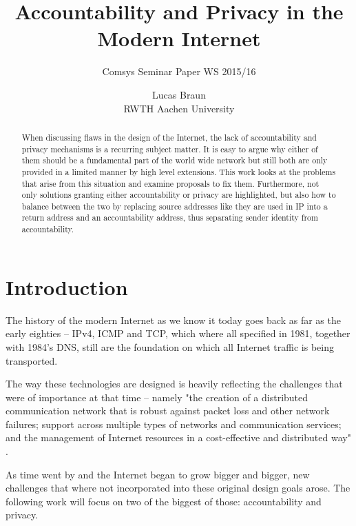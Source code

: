 \documentclass{acm_proc_article-sp}
\begin{document}
\title{Accountability and Privacy in the Modern Internet}
\subtitle{Comsys Seminar Paper WS 2015/16}

\author{
\alignauthor
Lucas Braun\\
	RWTH Aachen University \\
}

\maketitle
\begin{abstract}
When discussing flaws in the design of the Internet, the lack of accountability and privacy mechanisms is a recurring subject matter. It is easy to argue why either of them should be a fundamental part of the world wide network but still both are only provided in a limited manner by high level extensions. This work looks at the problems that arise from this situation and examine proposals to fix them. Furthermore, not only solutions granting either accountability or privacy are highlighted, but also how to balance between the two by replacing source addresses like they are used in IP into a return address and an accountability address, thus separating sender identity from accountability.
\end{abstract}

\section{Introduction}
The history of the modern Internet as we know it today goes back as far as the early eighties -- IPv4, ICMP and TCP, which where all specified in 1981, together with 1984's DNS, still are the foundation on which all Internet traffic is being transported.

The way these technologies are designed is heavily reflecting the challenges that were of importance at that time -- namely "the creation of a distributed communication network that is robust against packet loss and other network failures; support across multiple types of networks and communication services; and the management of Internet resources in a cost-effective and distributed way" \cite{mot}.

As time went by and the Internet began to grow bigger and bigger, new challenges that where not incorporated into these original design goals arose. The following work will focus on two of the biggest of those: accountability and privacy.
\end{document}
